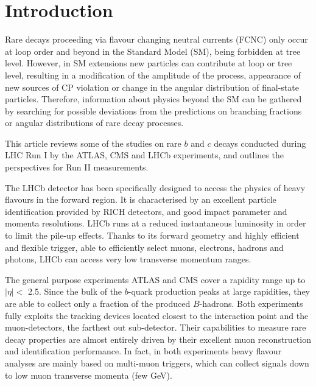 %
%
%
\section{Introduction}
\label{intro}
Rare decays proceeding via flavour changing neutral currents (FCNC) only occur at loop order and beyond in the Standard Model (SM), being forbidden at tree level.
However, in SM extensions new particles can contribute at loop or tree level, resulting in a modification of the amplitude of the process, appearance of new sources of CP violation or change in the angular distribution of final-state particles.
Therefore, information about physics beyond the SM can be gathered by searching for possible deviations from the predictions on branching fractions or angular distributions of rare decay processes.

This article reviews some of the studies on rare $b$ and $c$ decays conducted during LHC Run I by the ATLAS\cite{ATLAS}, CMS\cite{CMS} and LHCb\cite{LHCb} 
experiments, and outlines the perspectives for Run II measurements.

The LHCb detector has been specifically designed to access the physics of heavy flavours in the forward region.
It is characterised by an excellent particle identification provided by RICH detectors, and good impact parameter and momenta resolutions.
LHCb runs at a reduced instantaneous luminosity in order to limit the pile-up effects.
Thanks to its forward geometry and highly efficient and flexible trigger, able to efficiently select muons, electrons, hadrons and photons, LHCb can access very low transverse momentum ranges.

The general purpose experiments ATLAS and CMS cover a rapidity range up to $|\eta | <$ 2.5.
Since the bulk of the $b$-quark production peaks at large rapidities, they are able to collect only a fraction of the produced $B$-hadrons.
Both experiments fully exploits the tracking devices located closest to the interaction point and the muon-detectors, the farthest out sub-detector. 
Their capabilities to measure rare decay properties are almost entirely driven by their excellent muon reconstruction and identification performance. In fact, in both experiments heavy flavour analyses are mainly based on multi-muon triggers, which can collect signals down to low muon transverse momenta (few GeV).

